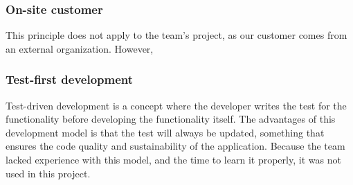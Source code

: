 \subsubsection{On-site customer}
This principle does not apply to the team's project, as our customer comes from an external organization. However,

\subsubsection{Test-first development}
Test-driven development is a concept where the developer writes the test for the functionality before developing the functionality itself. The advantages of this development model is that the test will always be updated, something that ensures the code quality and sustainability of the application. Because the team lacked experience with this model, and the time to learn it properly, it was not used in this project.


